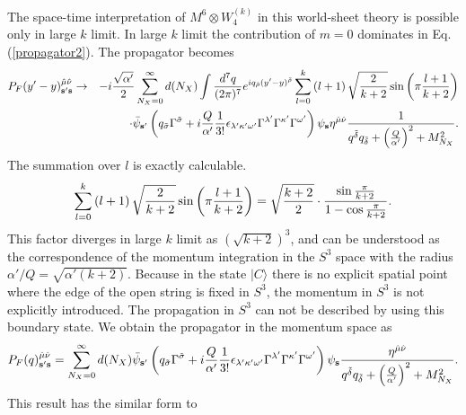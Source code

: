 \documentclass[a4paper,prd,preprint]{revtex4}
\begin{document}
The space-time interpretation
 of $M^6 \otimes W^{(k)}_4$ in this world-sheet theory
 is possible only in large $k$ limit.
In large $k$ limit
 the contribution of $m=0$ dominates in Eq.(\ref{propagator2}).
The propagator becomes
\begin{eqnarray}
 P_F(y'-y)_{{\bf s}'{\bf s}}^{{\hat \mu}{\hat \nu}} &\rightarrow&
 -i {\sqrt{\alpha'} \over 2}
  \sum_{N_X=0}^\infty d(N_X)
 \int {{d^7q} \over {(2\pi)^7}}
  e^{i q_{\tilde \rho} (y'-y)^{\tilde \rho}}
  \sum_{l=0}^k
  \left( l+1 \right)
  \sqrt{{2 \over {k+2}}} \sin \left( \pi {{l+1} \over {k+2}} \right)
\nonumber\\&&
  \cdot
  {\bar \psi}_{{\bf s}'}
   \left(
    q_{\tilde \sigma} \Gamma^{\tilde \sigma}
    + i {Q \over {\alpha'}} {1 \over {3!}}
        \epsilon_{\lambda'\kappa'\omega'}
         \Gamma^{\lambda'} \Gamma^{\kappa'} \Gamma^{\omega'}
   \right)
  \psi_{\bf s}
  \eta^{{\hat \mu}{\hat \nu}}
  {1 \over
   {
   q^{\tilde \delta} q_{\tilde \delta}
   + \left( {Q \over {\alpha'}} \right)^2 + M_{N_X}^2
   }}.
\end{eqnarray}
The summation over $l$ is exactly calculable.
\begin{equation}
  \sum_{l=0}^k
  \left( l+1 \right)
  \sqrt{{2 \over {k+2}}} \sin \left( \pi {{l+1} \over {k+2}} \right)
  = \sqrt{{{k+2} \over 2}} \cdot
    {{\sin {{\pi} \over {k+2}}} \over {1-\cos{{\pi} \over {k+2}}}}.
\end{equation}
This factor diverges in large $k$ limit as $(\sqrt{k+2})^3$,
 and can be understood as the correspondence of
 the momentum integration in the $S^3$ space
 with the radius $\alpha'/Q=\sqrt{\alpha'(k+2)}$.
Because in the state $| C \rangle$
 there is no explicit spatial point
 where the edge of the open string is fixed in $S^3$,
 the momentum in $S^3$ is not explicitly introduced.
The propagation in $S^3$
 can not be described by using this boundary state.
We obtain the propagator in the momentum space as
\begin{equation}
 P_F(q)_{{\bf s}'{\bf s}}^{{\hat \mu}{\hat \nu}} =
  \sum_{N_X=0}^\infty d(N_X)
  {\bar \psi}_{{\bf s}'}
   \left(
    q_{\tilde \sigma} \Gamma^{\tilde \sigma}
    + i {Q \over {\alpha'}} {1 \over {3!}}
        \epsilon_{\lambda'\kappa'\omega'}
         \Gamma^{\lambda'} \Gamma^{\kappa'} \Gamma^{\omega'}
   \right)
  \psi_{\bf s}
  {{\eta^{{\hat \mu}{\hat \nu}}} \over
   {
   q^{\tilde \delta} q_{\tilde \delta}
   + \left( {Q \over {\alpha'}} \right)^2 + M_{N_X}^2
   }}.
\label{propagator3}
\end{equation}
This result has the similar form to
\end{document}
